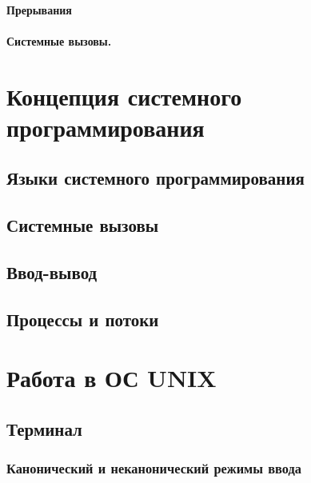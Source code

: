 \documentclass[oneside]{book}
\begin{document}
				\subsubsection{Прерывания}
				
				
				\subsubsection{Системные вызовы.}
				
		
		
	\chapter{Концепция системного программирования}
	
		
		\section{Языки системного программирования}
		
		
		\section{Системные вызовы}
		
		
		\section{Ввод-вывод}
		
		
		\section{Процессы и потоки}
		
	
	\chapter{Работа в ОС UNIX}
	
		\section{Терминал}
		
			
			\subsection{Канонический и неканонический режимы ввода}
			
		
\end{document}
